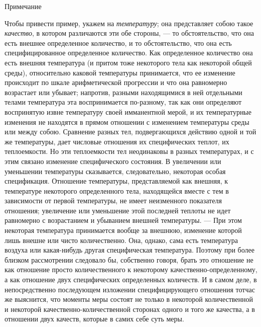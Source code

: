 {\centering
Примечание
\par}

Чтобы привести пример, укажем на {\em температуру}; она
представляет собою такое {\em качество}, в котором
различаются эти обе стороны, — то обстоятельство, что она есть внешнее
определенное количество, и то обстоятельство, что она есть
специфицированное определенное количество. Как определенное количество она
есть внешняя температура (и притом тоже некоторого тела как некоторой общей
среды), относительно каковой температуры принимается, что ее изменение
происходит по шкале арифметической прогрессии и что она равномерно
возрастает или убывает; напротив, разными находящимися в ней отдельными
телами температура эта воспринимается по-разному, так как они определяют
воспринятую извне температуру своей имманентной мерой, и их температурные
изменения не находятся в прямом отношении с изменением температуры среды
или между собою. Сравнение разных тел, подвергающихся действию одной и той
же температуры, дает числовые отношения их специфических теплот, их
теплоемкости. Но эти теплоемкости тел неодинаковы в разных температурах, и
с этим связано изменение специфического состояния. В увеличении или
уменьшении температуры сказывается, следовательно, некоторая особая
спецификация. Отношение температуры, представляемой как внешняя, к
температуре некоторого определенного тела, находящейся вместе с тем в
зависимости от первой температуры, не имеет неизменного показателя
отношения; увеличение или уменьшение этой последней теплоты не идет
равномерно с возрастанием и убыванием внешней температуры. — При этом
некоторая температура принимается вообще за внешнюю, изменение которой лишь
внешне или чисто количественно. Она, однако, сама есть температура воздуха
или какая-нибудь другая специфическая температура. Поэтому при более
близком рассмотрении следовало бы, собственно говоря, брать это отношение
не как отношение просто количественного к некоторому
качественно-определенному, а как отношение двух специфических определенных
количеств. И в самом деле, в непосредственно последующем изложении
специфицирующего отношения тотчас же выяснится, что моменты меры состоят не
только в некоторой количественной и некоторой качественно-количественной
сторонах одного и того же качества, а в отношении двух качеств, которые в
самих себе суть меры.

